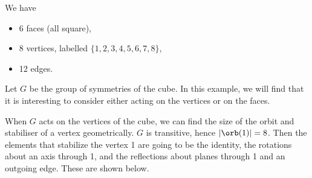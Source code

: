\documentclass[a4paper]{scrartcl}
\begin{document}
\begin{center}
\begin{tikzpicture}[x=0.75pt,y=0.75pt,yscale=-1,xscale=1]
\end{tikzpicture}

\end{center}

We have
\begin{itemize}
	\item 6 faces (all square),
	\item 8 vertices, labelled $\{1, 2, 3, 4, 5, 6, 7, 8\}$,
	\item 12 edges.
\end{itemize}

Let $G$ be the group of symmetries of the cube. In this example, we will find that it is interesting to consider either acting on the vertices or on the faces.

When $G$ acts on the vertices of the cube, we can find the size of the orbit and stabiliser of a vertex geometrically. $G$ is transitive, hence $|\orb(1)| = 8$. Then the elements that stabilize the vertex 1 are going to be the identity, the rotations about an axis through 1, and the reflections about planes through 1 and an outgoing edge. These are shown below.
\end{document}
